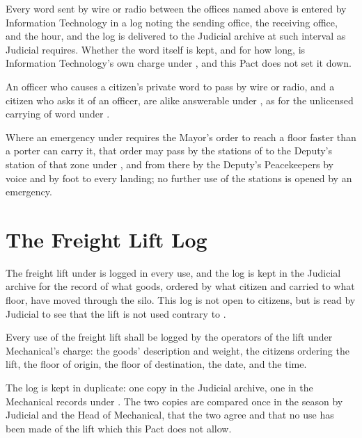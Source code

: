 \begin{clauses}
\item Every word sent by wire or radio between the offices named above is entered by Information Technology in a log noting the sending office, the receiving office, and the hour, and the log is delivered to the Judicial archive at such interval as Judicial requires. Whether the word itself is kept, and for how long, is Information Technology's own charge under , and this Pact does not set it down.
\item An officer who causes a citizen's private word to pass by wire or radio, and a citizen who asks it of an officer, are alike answerable under , as for the unlicensed carrying of word under .
\item Where an emergency under  requires the Mayor's order to reach a floor faster than a porter can carry it, that order may pass by the stations of  to the Deputy's station of that zone under , and from there by the Deputy's Peacekeepers by voice and by foot to every landing; no further use of the stations is opened by an emergency.
\end{clauses}

\section{The Freight Lift Log}
\label{sec:records:freight-lift-log}

The freight lift under  is logged in every use, and the log is kept in the Judicial archive for the record of what goods, ordered by what citizen and carried to what floor, have moved through the silo. This log is not open to citizens, but is read by Judicial to see that the lift is not used contrary to .

\begin{clauses}
\item Every use of the freight lift shall be logged by the operators of the lift under Mechanical's charge: the goods' description and weight, the citizens ordering the lift, the floor of origin, the floor of destination, the date, and the time.
\item The log is kept in duplicate: one copy in the Judicial archive, one in the Mechanical records under . The two copies are compared once in the season by Judicial and the Head of Mechanical, that the two agree and that no use has been made of the lift which this Pact does not allow.
\end{clauses}

